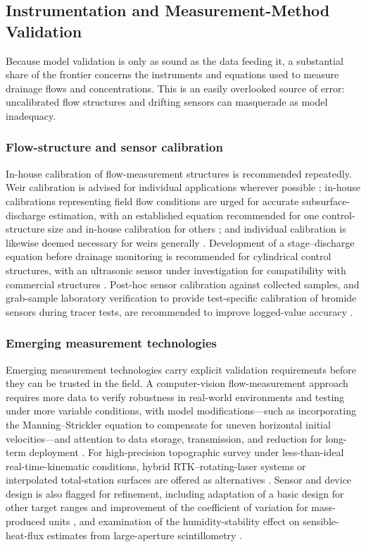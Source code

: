 \documentclass[11pt]{article}
\begin{document}
\subsection{Instrumentation and Measurement-Method Validation}

Because model validation is only as sound as the data feeding it, a substantial share of the frontier concerns the instruments and equations used to measure drainage flows and concentrations. This is an easily overlooked source of error: uncalibrated flow structures and drifting sensors can masquerade as model inadequacy.

\subsubsection{Flow-structure and sensor calibration}

In-house calibration of flow-measurement structures is recommended repeatedly. Weir calibration is advised for individual applications wherever possible \parencite{Christianson2019}; in-house calibrations representing field flow conditions are urged for accurate subsurface-discharge estimation, with an established equation recommended for one control-structure size and in-house calibration for others \parencite{Katuwal2024}; and individual calibration is likewise deemed necessary for weirs generally \parencite{Napierala2023}. Development of a stage--discharge equation before drainage monitoring is recommended for cylindrical control structures, with an ultrasonic sensor under investigation for compatibility with commercial structures \parencite{BinShokrana2021}. Post-hoc sensor calibration against collected samples, and grab-sample laboratory verification to provide test-specific calibration of bromide sensors during tracer tests, are recommended to improve logged-value accuracy \parencite{deOliveira2023b}.

\subsubsection{Emerging measurement technologies}

Emerging measurement technologies carry explicit validation requirements before they can be trusted in the field. A computer-vision flow-measurement approach requires more data to verify robustness in real-world environments and testing under more variable conditions, with model modifications---such as incorporating the Manning--Strickler equation to compensate for uneven horizontal initial velocities---and attention to data storage, transmission, and reduction for long-term deployment \parencite{Young2023}. For high-precision topographic survey under less-than-ideal real-time-kinematic conditions, hybrid RTK--rotating-laser systems or interpolated total-station surfaces are offered as alternatives \parencite{Freeland2014}. Sensor and device design is also flagged for refinement, including adaptation of a basic design for other target ranges and improvement of the coefficient of variation for mass-produced units \parencite{Enamorado2007}, and examination of the humidity-stability effect on sensible-heat-flux estimates from large-aperture scintillometry \parencite{Zhang2010}.
\end{document}
